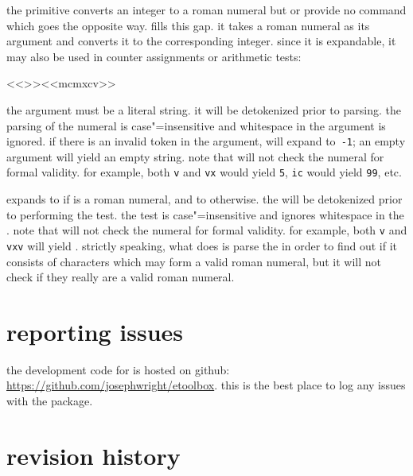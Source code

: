 \begin{ltxsyntax}


the \tex primitive  converts an integer to a roman numeral but \tex or \latex provide no command which goes the opposite way.  fills this gap. it takes a roman numeral as its argument and converts it to the corresponding integer. since it is expandable, it may also be used in counter assignments or arithmetic tests:

\begin{ltxcode}
<<\rmntonum>>{<<mcmxcv>>}
\end{ltxcode}
%
the  argument must be a literal string. it will be detokenized prior to parsing. the parsing of the numeral is case"=insensitive and whitespace in the argument is ignored. if there is an invalid token in the argument,  will expand to~\texttt{-1}; an empty argument will yield an empty string. note that  will not check the numeral for formal validity. for example, both \texttt{v} and \texttt{vx} would yield \texttt{5}, \texttt{ic} would yield \texttt{99}, etc.


expands to  if  is a roman numeral, and to  otherwise. the  will be detokenized prior to performing the test. the test is case"=insensitive and ignores whitespace in the . note that  will not check the numeral for formal validity. for example, both \texttt{v} and \texttt{vxv} will yield . strictly speaking, what  does is parse the  in order to find out if it consists of characters which may form a valid roman numeral, but it will not check if they really are a valid roman numeral.

\end{ltxsyntax}

\section{reporting issues}

the development code for  is hosted on github: \url{https://github.com/josephwright/etoolbox}. this is the best place to log any issues with the package.

\section{revision history}

